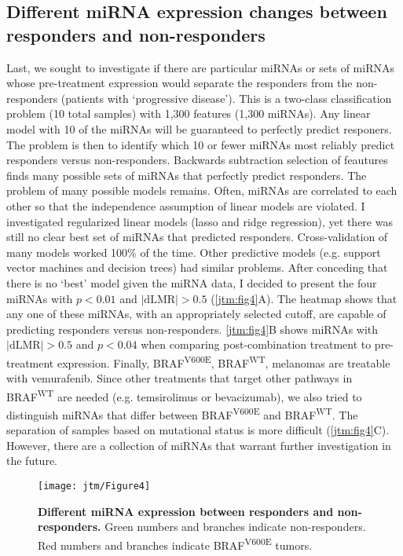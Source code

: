 \subsection{Different miRNA expression changes between responders and non-responders}
Last, we sought to investigate if there are particular miRNAs or sets
of miRNAs whose pre-treatment expression would separate the responders from the non-responders
(patients with `progressive disease'). This is a two-class
classification problem (10 total samples) with 1,300 features (1,300 miRNAs). 
Any linear model with 10 of the miRNAs will be guaranteed to perfectly predict
responers. The problem is then to identify which 10 or fewer miRNAs
most reliably predict responders versus non-responders. Backwards subtraction 
selection of feautures finds many possible sets of miRNAs
that perfectly predict responders. The problem of many possible models remains.
Often, miRNAs are correlated to each other so that
the independence assumption of linear models are violated. I investigated 
regularized linear models (lasso and ridge regression), yet there was still no clear
best set of miRNAs that predicted responders. Cross-validation of many models
worked 100\% of the time. Other predictive models (e.g. support vector machines and
decision trees) had similar problems. After conceding that there is no `best' model given
the miRNA data, I decided to present the four miRNAs with $p<0.01$ and $|\text{dLMR}|>0.5$
(\autoref{jtm:fig4}A). The heatmap shows that any one of these miRNAs, with an
appropriately selected cutoff, are capable of predicting responders versus non-responders.
\autoref{jtm:fig4}B shows miRNAs with $|\text{dLMR}|>0.5$ and $p<0.04$ when comparing post-combination
treatment to pre-treatment expression. Finally, BRAF\textsuperscript{V600E}, BRAF\textsuperscript{WT}, melanomas are 
treatable with vemurafenib. Since other treatments that target other pathways in BRAF\textsuperscript{WT}
are needed (e.g. temsirolimus or bevacizumab), we also tried to distinguish 
miRNAs that differ between BRAF\textsuperscript{V600E} and BRAF\textsuperscript{WT}.
The separation of samples based on mutational status is more difficult (\autoref{jtm:fig4}C).
However, there are a collection of miRNAs that warrant further investigation in the future.

\begin{figure}[h!]
  \centering
  \texttt{[image: jtm/Figure4]}
  \caption[Different miRNA expression between responders and non-responders]{
       \textbf{Different miRNA expression between responders and non-responders.}
       Green numbers and branches indicate non-responders. Red numbers and branches indicate
       BRAF\textsuperscript{V600E} tumors.
  }
  \label{jtm:fig4}
\end{figure}

